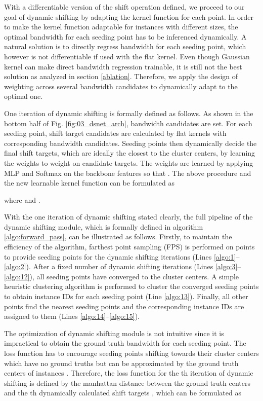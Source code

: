 \documentclass[final]{cvpr}
\begin{document}
With a differentiable version of the shift operation defined, we proceed to our goal
of dynamic shifting by adapting the kernel function for each point.
In order to make the kernel function adaptable for instances with different sizes, the optimal bandwidth
for each seeding point has to be inferenced dynamically.
A natural solution is to directly regress bandwidth for each seeding point, which however is not differentiable
if used with the flat kernel.
Even though Gaussian kernel can make direct bandwidth regression trainable, it is still not the best solution
as analyzed in section \ref{ablation}.
Therefore, we apply the design of weighting across several bandwidth candidates to dynamically adapt to the optimal one.

One iteration of dynamic shifting is formally defined as follows.
As shown in the bottom half of Fig. \ref{fig:03_dsnet_arch},  bandwidth candidates
 are set.
For each seeding point,  shift target candidates are calculated by  flat kernels with corresponding
bandwidth candidates.
Seeding points then dynamically decide the final shift targets, which are ideally the closest to the cluster centers,
by learning the weights  to weight on  candidate targets.
The weights  are learned by applying MLP and Softmax on the backbone features so that
.
The above procedure and the new learnable kernel function  can be formulated as

where  and .

With the one iteration of dynamic shifting stated clearly, the full pipeline of the dynamic shifting module, which is
formally defined in algorithm \ref{algo:forward_pass}, can be illustrated as follows.
Firstly, to maintain the efficiency of the algorithm, farthest point sampling (FPS) is performed on  \things{}
points to provide  seeding points for the dynamic shifting iterations (Lines \ref{algo:1}--\ref{algo:2}).
After a fixed number  of dynamic shifting iterations (Lines \ref{algo:3}--\ref{algo:12}), all seeding points have converged to the cluster centers.
A simple heuristic clustering algorithm is performed to cluster the converged seeding points to obtain
instance IDs for each seeding point (Line \ref{algo:13}).
Finally, all other \things{} points find the nearest seeding points and the corresponding instance IDs are
assigned to them (Lines \ref{algo:14}--\ref{algo:15}).

The optimization of dynamic shifting module is not intuitive since it is impractical to obtain the ground
truth bandwidth for each seeding point.
The loss function has to encourage seeding points shifting towards their cluster
centers which have no ground truths but can be approximated by the ground truth centers of instances
.
Therefore, the loss function for the th iteration of dynamic shifting is defined by the manhattan distance between
the ground truth centers  and the th dynamically calculated shift targets , which can be
formulated as
\end{document}
